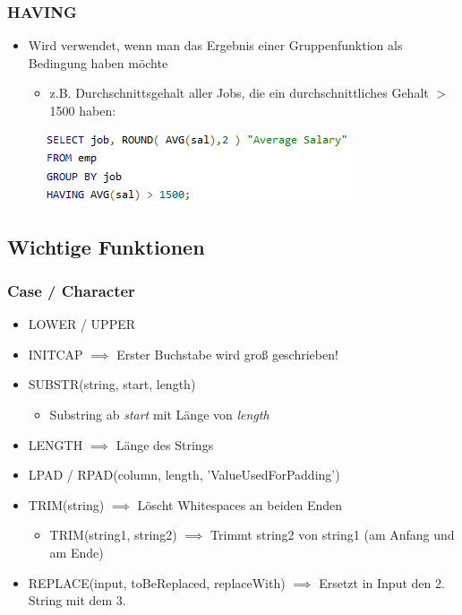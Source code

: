 \subsubsection{HAVING}
\begin{itemize}
    \item Wird verwendet, wenn man das Ergebnis einer Gruppenfunktion als Bedingung haben möchte
    \begin{itemize}
        \item z.B. Durchschnittsgehalt aller Jobs, die ein durchschnittliches Gehalt $>$ 1500 haben:
    \end{itemize}
\end{itemize}
\begin{figure}[ht!]
    \centering 
    \includegraphics[]{res/themekorb_2/having.png}
\end{figure}

\subsection{Wichtige Funktionen}

\subsubsection{Case / Character}
\begin{itemize}
    \item LOWER / UPPER
    \item INITCAP $\implies$ Erster Buchstabe wird groß geschrieben!
    \item SUBSTR(string, start, length)
    \begin{itemize}
        \item Substring ab \textit{start} mit Länge von \textit{length}
    \end{itemize}
    \item LENGTH $\implies$ Länge des Strings
    \item LPAD / RPAD(column, length, 'ValueUsedForPadding')
    \item TRIM(string) $\implies$ Löscht Whitespaces an beiden Enden
    \begin{itemize}
        \item TRIM(string1, string2) $\implies$ Trimmt string2 von string1 (am Anfang und am Ende)
    \end{itemize}
    \item REPLACE(input, toBeReplaced, replaceWith) $\implies$ Ersetzt in Input den 2. String mit dem 3.
\end{itemize}

